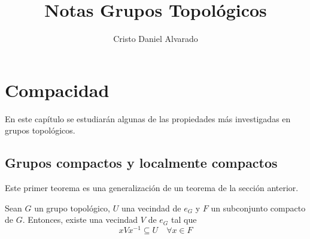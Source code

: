 \documentclass[12pt]{report}
\theoremstyle{largebreak}
\begin{document}
    \setlength{\parskip}{5pt} %
    \setlength{\parindent}{12pt} %
    \title{Notas Grupos Topológicos}
    \author{Cristo Daniel Alvarado}
    \maketitle

    \tableofcontents %

    \setcounter{chapter}{1} %
    
    \chapter{Compacidad}

    En este capítulo se estudiarán algunas de las propiedades más investigadas en grupos topológicos.

    \section{Grupos compactos y localmente compactos}

    Este primer teorema es una generalización de un teorema de la sección anterior.

    \begin{theor}
        Sean $G$ un grupo topológico, $U$ una vecindad de $e_G$ y $F$ un subconjunto compacto de $G$. Entonces, existe una vecindad $V$ de $e_G$ tal que
        \begin{equation*}
            xVx^{-1}\subseteq U\quad\forall x\in F
        \end{equation*}
    \end{theor}
\end{document}

